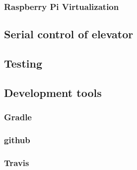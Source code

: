 \documentclass[a4paper, 12pt]{article}
\begin{document}
\subsubsection{Raspberry Pi Virtualization}

\subsection{Serial control of elevator}
\subsection{Testing}
\subsection{Development tools}

\subsubsection{Gradle}

\subsubsection{github}

\subsubsection{Travis}



\end{document}
